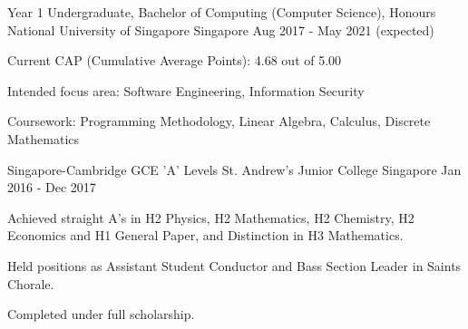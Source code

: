

\begin{cventries}

  \cventry
    {Year 1 Undergraduate, Bachelor of Computing (Computer Science), Honours} %
    {National University of Singapore} %
    {Singapore} %
    {Aug 2017 - May 2021 (expected)} %
    {
      \begin{cvitems} %
        \item {Current CAP (Cumulative Average Points): 4.68 out of 5.00}
        \item {Intended focus area: Software Engineering, Information Security}
        \item {Coursework: Programming Methodology, Linear Algebra, Calculus, Discrete Mathematics}
      \end{cvitems}
    }
    
	\cventry
	{Singapore-Cambridge GCE 'A' Levels} %
	{St. Andrew's Junior College} %
	{Singapore} %
	{Jan 2016 - Dec 2017} %
	{
		\begin{cvitems} %
			\item {Achieved straight A's in H2 Physics, H2 Mathematics, H2 Chemistry, H2 Economics and H1 General Paper, and Distinction in H3 Mathematics.}
			\item {Held positions as Assistant Student Conductor and Bass Section Leader in Saints Chorale.}
			\item {Completed under full scholarship.}
		\end{cvitems}
	}
    


\end{cventries}
